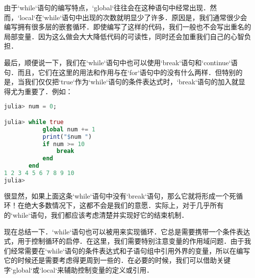 由于`while`语句的编写特点，`global`往往会在这种语句中经常出现．然而，`local`在`while`语句中出现的次数就明显少了许多．原因是，我们通常很少会编写拥有很多层的嵌套循环．即使编写了这样的代码，我们一般也不会写出重名的局部变量．因为这么做会大大降低代码的可读性，同时还会加重我们自己的心智负担．

最后，顺便说一下，我们在`while`语句中也可以使用`break`语句和`continue`语句．而且，它们在这里的用法和作用与在`for`语句中的没有什么两样．但特别的是，当我们仅仅把`true`作为`while`语句的条件表达式时，`break`语句的加入就显得尤为重要了．例如：

\begin{lstlisting}[language=julia]
julia> num = 0;

julia> while true
           global num += 1
           print("$num ")
           if num >= 10
               break
           end
       end
1 2 3 4 5 6 7 8 9 10 
julia> 
\end{lstlisting}

很显然，如果上面这条`while`语句中没有`break`语句，那么它就将形成一个死循环！在绝大多数情况下，这都不会是我们的意愿．实际上，对于几乎所有的`while`语句，我们都应该考虑清楚并实现好它的结束机制．

现在总结一下．`while`语句也可以被用来实现循环．它总是需要携带一个条件表达式，用于控制循环的启停．在这里，我们需要特别注意变量的作用域问题．由于我们经常需要在`while`语句的条件表达式和子语句组中引用外界的变量，所以在编写它的时候还是需要考虑得更周到一些的．在必要的时候，我们可以借助关键字`global`或`local`来辅助控制变量的定义或引用．